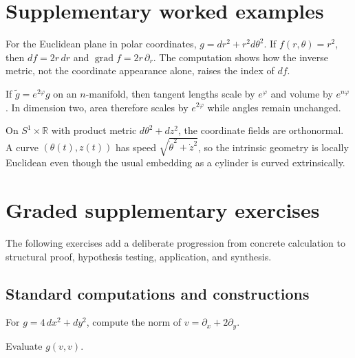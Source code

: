 \section{Supplementary worked examples}
\label{sec:vii20-pedagogy}

\begin{example}\label{ex:vii20-ped-01}
For the Euclidean plane in polar coordinates, \(g=dr^2+r^2d\theta^2\).  If \(f(r,\theta)=r^2\), then \(df=2r\,dr\) and \(\operatorname{grad}f=2r\,\partial_r\).  The computation shows how the inverse metric, not the coordinate appearance alone, raises the index of \(df\).
\end{example}

\begin{example}\label{ex:vii20-ped-02}
If \(\widetilde g=e^{2\varphi}g\) on an \(n\)-manifold, then tangent lengths scale by \(e^\varphi\) and volume by \(e^{n\varphi}\).  In dimension two, area therefore scales by \(e^{2\varphi}\) while angles remain unchanged.
\end{example}

\begin{example}\label{ex:vii20-ped-03}
On \(S^1\times\mathbb R\) with product metric \(d\theta^2+dz^2\), the coordinate fields are orthonormal.  A curve \((\theta(t),z(t))\) has speed \(\sqrt{\dot\theta^2+\dot z^2}\), so the intrinsic geometry is locally Euclidean even though the usual embedding as a cylinder is curved extrinsically.
\end{example}

\section{Graded supplementary exercises}
The following exercises add a deliberate progression from concrete calculation to structural proof, hypothesis testing, application, and synthesis.

\subsection*{Standard computations and constructions}

\begin{exercise}\label{exr:vii20-ped-01}
For \(g=4\,dx^2+dy^2\), compute the norm of \(v=\partial_x+2\partial_y\).
\end{exercise}

\begin{hint}
Evaluate \(g(v,v)\).
\end{hint}

